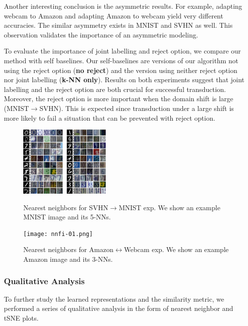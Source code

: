 Another interesting conclusion is the asymmetric results. For example, adapting webcam to Amazon and adapting Amazon to webcam yield very different accuracies. The similar asymmetry exists in MNIST and SVHN as well. This observation validates the importance of an asymmetric modeling.

To evaluate the importance of joint labelling and reject option, we compare our method with self baselines. Our self-baselines are versions of our algorithm not using the reject option (\textbf{no reject}) and the version using neither reject option nor joint labelling (\textbf{k-NN only}). Results on both experiments suggest that joint labelling and the reject option are both crucial for successful transduction. Moreover, the reject option is more important when the domain shift is large (\eg MNIST$\rightarrow$SVHN). This is expected since transduction under a large shift is more likely to fail a situation that can be prevented with reject option.

\begin{figure}
\small
\begin{small}
\includegraphics[width=0.4\textwidth]{nndig}
\vspace{-5mm}
\caption{Nearest neighbors for SVHN$\rightarrow$MNIST exp. We show an example MNIST image and its 5-NNs.}
\label{fig:nn}
\texttt{[image: nnfi-01.png]}
\caption{Nearest neighbors for Amazon$\leftrightarrow$Webcam exp. We show an example Amazon image and its 3-NNs. }
\label{fig:nnoffice}
\end{small}
\vspace{-5mm}
\end{figure}





\subsubsection{Qualitative Analysis}
To further study the learned representations and the similarity metric, we performed a series of qualitative analysis in the form of nearest neighbor and tSNE\cite{tsne} plots.


